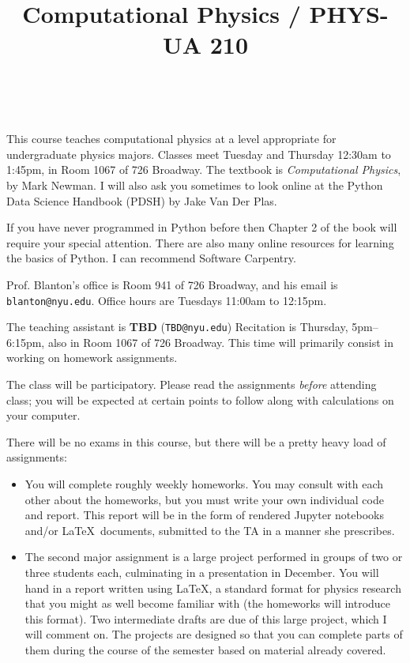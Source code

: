 \documentclass[11pt, preprint]{aastex}
\begin{document}
\title{\bf Computational Physics / PHYS-UA 210}
~
~

\noindent This course teaches computational physics at a level
appropriate for undergraduate physics majors.  Classes meet Tuesday
and Thursday 12:30am to 1:45pm, in Room 1067 of 726 Broadway.  The
textbook is {\it Computational Physics}, by Mark Newman. I will also
ask you sometimes to look online at the Python Data Science Handbook
(PDSH) by Jake Van Der Plas.

\noindent If you have never programmed in Python before then Chapter 2
of the book will require your special attention. There are also many
online resources for learning the basics of Python. I can recommend
Software Carpentry.

\noindent Prof. Blanton's office is Room 941 of 726 Broadway, and his
email is {\tt blanton@nyu.edu}.  Office hours are Tuesdays 11:00am to
12:15pm.

\noindent The teaching assistant is {\bf TBD} ({\tt TBD@nyu.edu})
Recitation is Thursday, 5pm--6:15pm, also in Room 1067 of 726
Broadway. This time will primarily consist in working on homework
assignments.

\noindent The class will be participatory. Please read the assignments
          {\it before} attending class; you will be expected at
          certain points to follow along with calculations on your
          computer.

\noindent There will be no exams in this course, but there will be a
pretty heavy load of assignments:
\begin{itemize}
\item You will complete roughly weekly homeworks. You may consult with
  each other about the homeworks, but you must write your own
  individual code and report. This report will be in the form of
  rendered Jupyter notebooks and/or \LaTeX\ documents, submitted to
  the TA in a manner she prescribes.
\item The second major assignment is a large project performed in
  groups of two or three students each, culminating in a presentation
  in December. You will hand in a report written using \LaTeX, a
  standard format for physics research that you might as well become
  familiar with (the homeworks will introduce this format). Two
  intermediate drafts are due of this large project, which I will
  comment on. The projects are designed so that you can complete parts
  of them during the course of the semester based on
  material already covered. 
\end{itemize}
\end{document}
